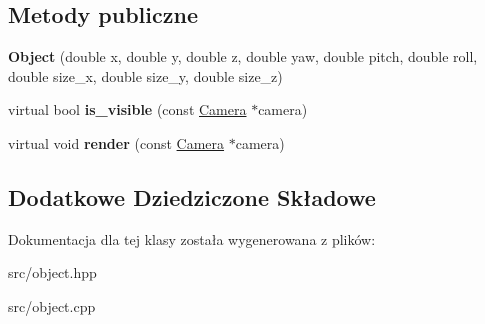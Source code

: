 \subsection*{Metody publiczne}
\begin{DoxyCompactItemize}
\item 
{\bfseries Object} (double x, double y, double z, double yaw, double pitch, double roll, double size\+\_\+x, double size\+\_\+y, double size\+\_\+z)\hypertarget{class_object_a7183ffb5489cedf54629055db8d57ff5}{}\label{class_object_a7183ffb5489cedf54629055db8d57ff5}

\item 
virtual bool {\bfseries is\+\_\+visible} (const \hyperlink{class_camera}{Camera} $\ast$camera)\hypertarget{class_object_ab4c6e9456feda15cf49b85ce196666e6}{}\label{class_object_ab4c6e9456feda15cf49b85ce196666e6}

\item 
virtual void {\bfseries render} (const \hyperlink{class_camera}{Camera} $\ast$camera)\hypertarget{class_object_a7b6ef90438e4b82e479197bc6261c25a}{}\label{class_object_a7b6ef90438e4b82e479197bc6261c25a}

\end{DoxyCompactItemize}
\subsection*{Dodatkowe Dziedziczone Składowe}


Dokumentacja dla tej klasy została wygenerowana z plików\+:\begin{DoxyCompactItemize}
\item 
src/object.\+hpp\item 
src/object.\+cpp\end{DoxyCompactItemize}

